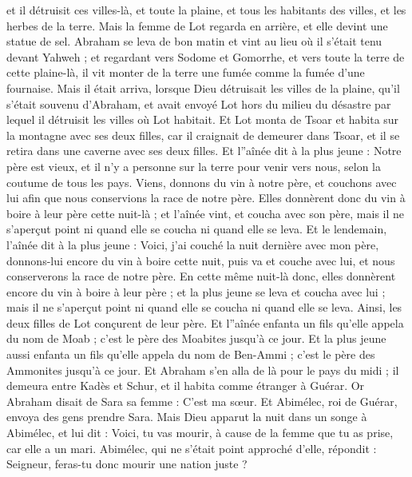 \begin{multicols}{2}
et il détruisit ces villes-là, et toute la plaine, et tous les habitants des villes, et les herbes de la terre.
Mais la femme de Lot regarda en arrière, et elle devint une statue de sel.
Abraham se leva de bon matin et vint au lieu où il s'était tenu devant Yahweh ;
et regardant vers Sodome et Gomorrhe, et vers toute la terre de cette plaine-là, il vit monter de la terre une fumée comme la fumée d'une fournaise.
Mais il était arriva, lorsque Dieu détruisait les villes de la plaine, qu'il s'était souvenu d'Abraham, et avait envoyé Lot hors du milieu du désastre par lequel il détruisit les villes où Lot habitait.
Et Lot monta de Tsoar et habita sur la montagne avec ses deux filles, car il craignait de demeurer dans Tsoar, et il se retira dans une caverne avec ses deux filles.
Et l''aînée dit à la plus jeune : Notre père est vieux, et il n'y a personne sur la terre pour venir vers nous, selon la coutume de tous les pays.
Viens, donnons du vin à notre père, et couchons avec lui afin que nous conservions la race de notre père.
Elles donnèrent donc du vin à boire à leur père cette nuit-là ; et l'aînée vint, et coucha avec son père, mais il ne s'aperçut point ni quand elle se coucha ni quand elle se leva.
Et le lendemain, l'aînée dit à la plus jeune : Voici, j'ai couché la nuit dernière avec mon père, donnons-lui encore du vin à boire cette nuit, puis va et couche avec lui, et nous conserverons la race de notre père.
En cette même nuit-là donc, elles donnèrent encore du vin à boire à leur père ; et la plus jeune se leva et coucha avec lui ; mais il ne s'aperçut point ni quand elle se coucha ni quand elle se leva.
Ainsi, les deux filles de Lot conçurent de leur père.
Et l''aînée enfanta un fils qu'elle appela du nom de Moab ; c'est le père des Moabites jusqu'à ce jour.
Et la plus jeune aussi enfanta un fils qu'elle appela du nom de Ben-Ammi ; c'est le père des Ammonites jusqu'à ce jour.
\VerseOne{}Et Abraham s'en alla de là pour le pays du midi ; il demeura entre Kadès et Schur, et il habita comme étranger à Guérar.
Or Abraham disait de Sara sa femme : C'est ma sœur. Et Abimélec, roi de Guérar, envoya des gens prendre Sara.
Mais Dieu apparut la nuit dans un songe à Abimélec, et lui dit : Voici, tu vas mourir, à cause de la femme que tu as prise, car elle a un mari.
Abimélec, qui ne s'était point approché d'elle, répondit : Seigneur, feras-tu donc mourir une nation juste ?

\end{multicols}
